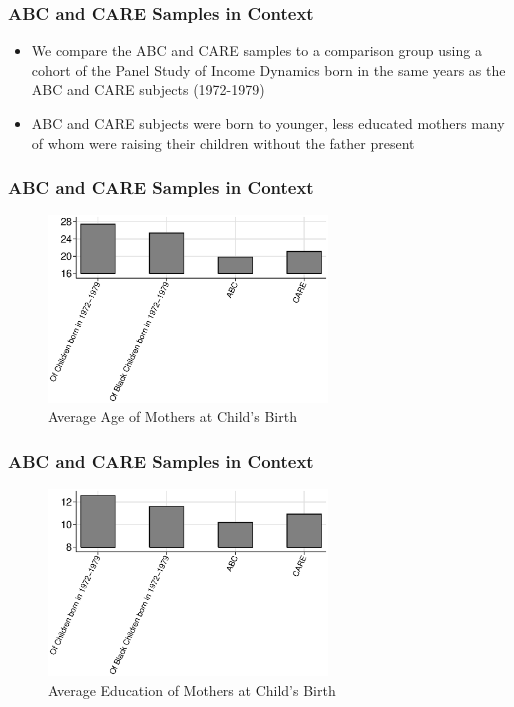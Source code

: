 \documentclass[static]{JJH-Beamer}
\begin{document}

\begin{frame}
\frametitle{ABC and CARE Samples in Context}
\begin{itemize}
	\item We compare the ABC and CARE samples to a comparison group using a cohort of the Panel Study of Income Dynamics born in the same years as the ABC and CARE subjects (1972-1979)
	\item ABC and CARE subjects were born to younger, less educated mothers many of whom were raising their children without the father present
\end{itemize}
\end{frame}


\begin{frame}
\frametitle{ABC and CARE Samples in Context}
\begin{figure}
\caption{Average Age of Mothers at Child's Birth}
	\includegraphics[width=20em]{output/abccarepsid_m_age0pool.eps}
\end{figure}
\end{frame}


\begin{frame}
\frametitle{ABC and CARE Samples in Context}
\begin{figure}
\caption{Average Education of Mothers at Child's Birth}
	\includegraphics[width=20em]{output/abccarepsid_m_edu0pool.eps}
\end{figure}
\end{frame}
\end{document}
